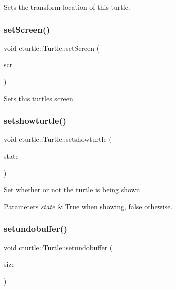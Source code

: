 Sets the transform location of this turtle. 

\mbox{\label{classcturtle_1_1Turtle_a0f47c7d9a17258780d4d0134daf78522}} 
\subsubsection{\texorpdfstring{set\+Screen()}{setScreen()}}
{\footnotesize\ttfamily void cturtle\+::\+Turtle\+::set\+Screen (\begin{DoxyParamCaption}\item[{\hyperlink{classcturtle_1_1AbstractTurtleScreen}{Abstract\+Turtle\+Screen} $\ast$}]{scr }\end{DoxyParamCaption})\hspace{0.3cm}{\ttfamily [inline]}}

Sets this turtles screen. \mbox{\label{classcturtle_1_1Turtle_a9e83fdd5c469e4863cf9b460e4d29130}} 
\subsubsection{\texorpdfstring{setshowturtle()}{setshowturtle()}}
{\footnotesize\ttfamily void cturtle\+::\+Turtle\+::setshowturtle (\begin{DoxyParamCaption}\item[{bool}]{state }\end{DoxyParamCaption})}



Set whether or not the turtle is being shown. 


\begin{DoxyParams}{Parameters}
{\em state} & True when showing, false othewise. \\
\hline
\end{DoxyParams}
\mbox{\label{classcturtle_1_1Turtle_a91536102f8903dc237d97dbf3f326eba}} 
\subsubsection{\texorpdfstring{setundobuffer()}{setundobuffer()}}
{\footnotesize\ttfamily void cturtle\+::\+Turtle\+::setundobuffer (\begin{DoxyParamCaption}\item[{unsigned int}]{size }\end{DoxyParamCaption})\hspace{0.3cm}{\ttfamily [inline]}}



